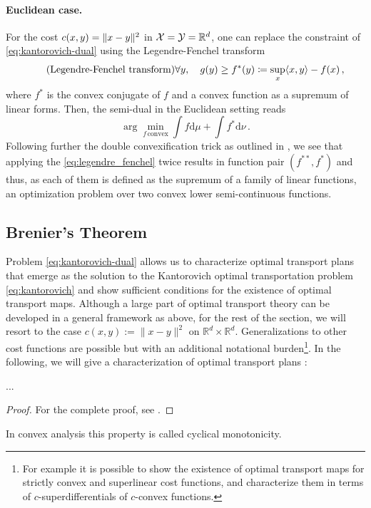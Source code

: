 \paragraph{Euclidean case.} For the cost $c(x, y) = \lVert x-y\rVert^2$ in ${\mathcal{X}} = {\mathcal{Y}} = \mathbb{R}^d$, one can replace the constraint of \eqref{eq:kantorovich-dual} using the Legendre-Fenchel transform
\begin{equation} \label{eq:legendre_fenchel}
	\tag{Legendre-Fenchel transform}
	\forall y, \quad g(y) \geq f^*(y) \coloneqq \sup _x\langle x, y\rangle-f(x)\,,
\end{equation}
where $f^*$ is the convex conjugate of $f$ and a convex function as a supremum of linear forms. Then, the semi-dual in the Euclidean setting reads
\begin{equation} \label{eq:dual-cvx}
	\arg\!\!\min_{f\, \text{convex}} \int f \textrm{d}\mu + \int f^*\textrm{d}\nu\,.
\end{equation}
Following further the double convexification trick as outlined in \citet[Lemma 2.10]{villani2021topics}, we see that applying the \ref{eq:legendre_fenchel} twice results in function pair $(f^{**},f^{*})$ and thus,  as each of them is defined as the supremum of a family of linear functions, an optimization problem over two convex lower semi-continuous functions.

\subsection{Brenier's Theorem} \label{sec:background_brenier}

Problem \eqref{eq:kantorovich-dual} allows us to characterize optimal transport plans that emerge as the solution to the Kantorovich optimal transportation problem \eqref{eq:kantorovich} and show sufficient conditions for the existence of optimal transport maps.
Although a large part of optimal transport theory can be developed in a general framework as above, for the rest of the section, we will resort to the case $c(x, y):=\|x-y\|^2$ on $\mathbb{R}^d \times \mathbb{R}^d$. Generalizations to other cost functions are possible but with an additional notational burden\footnote{For example it is possible to show the existence of optimal transport maps for strictly convex and superlinear cost functions, and characterize them in terms of $c$-superdifferentials of $c$-convex functions.}.
In the following, we will give a characterization of optimal transport plans \citep{knott1984optimal}:

\begin{theorem}
	...
\end{theorem}
\begin{proof}
	For the complete proof, see \citet[Proof of Theorem 2.12]{villani2021topics}.
\end{proof}
In convex analysis this property is called cyclical monotonicity.

